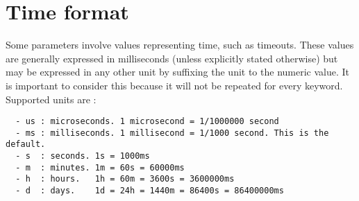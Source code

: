 
\section{Time format}

Some parameters involve values representing time, such as timeouts. These
values are generally expressed in milliseconds (unless explicitly stated
otherwise) but may be expressed in any other unit by suffixing the unit to the
numeric value. It is important to consider this because it will not be repeated
for every keyword. Supported units are :

\begin{verbatim}
  - us : microseconds. 1 microsecond = 1/1000000 second
  - ms : milliseconds. 1 millisecond = 1/1000 second. This is the default.
  - s  : seconds. 1s = 1000ms
  - m  : minutes. 1m = 60s = 60000ms
  - h  : hours.   1h = 60m = 3600s = 3600000ms
  - d  : days.    1d = 24h = 1440m = 86400s = 86400000ms
\end{verbatim}

